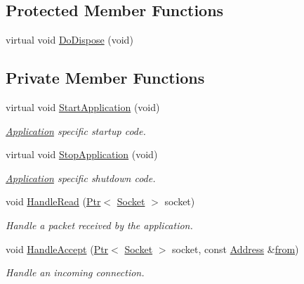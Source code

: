 \subsection*{Protected Member Functions}
\begin{DoxyCompactItemize}
\item 
virtual void \hyperlink{classns3_1_1PacketSink_a00aee3d4e6a589e9e17a2c75f7e0c710}{Do\+Dispose} (void)
\end{DoxyCompactItemize}
\subsection*{Private Member Functions}
\begin{DoxyCompactItemize}
\item 
virtual void \hyperlink{classns3_1_1PacketSink_a45449bbaa6fb20caed62418f029d79d6}{Start\+Application} (void)
\begin{DoxyCompactList}\small\item\em \hyperlink{classns3_1_1Application}{Application} specific startup code. \end{DoxyCompactList}\item 
virtual void \hyperlink{classns3_1_1PacketSink_a622558c6115057d0d425657242843dd2}{Stop\+Application} (void)
\begin{DoxyCompactList}\small\item\em \hyperlink{classns3_1_1Application}{Application} specific shutdown code. \end{DoxyCompactList}\item 
void \hyperlink{classns3_1_1PacketSink_a6bffa1d7397f8aa2588a19686301de55}{Handle\+Read} (\hyperlink{classns3_1_1Ptr}{Ptr}$<$ \hyperlink{classns3_1_1Socket}{Socket} $>$ socket)
\begin{DoxyCompactList}\small\item\em Handle a packet received by the application. \end{DoxyCompactList}\item 
void \hyperlink{classns3_1_1PacketSink_a74ea2fb5fda8a63020c6453258a1cd2f}{Handle\+Accept} (\hyperlink{classns3_1_1Ptr}{Ptr}$<$ \hyperlink{classns3_1_1Socket}{Socket} $>$ socket, const \hyperlink{classns3_1_1Address}{Address} \&\hyperlink{lte__amc_8m_a1b4c81ff74eb1a626b5ade44c81004b3}{from})
\begin{DoxyCompactList}\small\item\em Handle an incoming connection. \end{DoxyCompactList}\item 

\end{DoxyCompactItemize}
